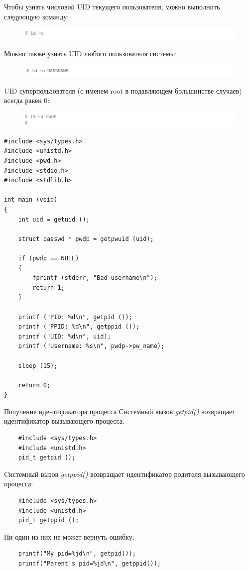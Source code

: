 \documentclass[xcolor=table]{beamer}
\begin{document}
\begin{frame}
	Чтобы узнать числовой UID текущего пользователя, можно выполнить следующую команду:
	\begin{figure}[h]
		\centering
		\includegraphics[scale=0.4]{images/lec07-pic26.png}
	\end{figure}
	Можно также узнать UID любого пользователя системы:
	\begin{figure}[h]
		\centering
		\includegraphics[scale=0.4]{images/lec07-pic27.png}
	\end{figure}
	UID суперпользователя (с именем root в подавляющем большинстве случаев) всегда равен 0:
	\begin{figure}[h]
		\centering
		\includegraphics[scale=0.4]{images/lec07-pic28.png}
	\end{figure}
\end{frame}

\begin{frame}
	\begin{verbatim}
#include <sys/types.h>
#include <unistd.h>
#include <pwd.h>
#include <stdio.h>
#include <stdlib.h>

int main (void)
{
    int uid = getuid ();

    struct passwd * pwdp = getpwuid (uid);
    
    if (pwdp == NULL)
    {
        fprintf (stderr, "Bad username\n");
        return 1;
    }

    printf ("PID: %d\n", getpid ());
    printf ("PPID: %d\n", getppid ());
    printf ("UID: %d\n", uid);
    printf ("Username: %s\n", pwdp->pw_name);

    sleep (15);

    return 0;
}
	\end{verbatim}
\end{frame}

\begin{frame}[fragile]{Получение идентификатора процесса}
	Системный вызов \textit{getpid()} возвращает идентификатор вызывающего процесса:
	\begin{verbatim}
	#include <sys/types.h>
	#include <unistd.h>
	pid_t getpid ();
	\end{verbatim}
	Cистемный вызов \textit{getppid()} возвращает идентификатор родителя вызывающего процесса:
	\begin{verbatim}
	#include <sys/types.h>
	#include <unistd.h>
	pid_t getppid ();
	\end{verbatim}
	Ни один из них не может вернуть ошибку:
	\begin{verbatim}
	printf("My pid=%jd\n", getpid());
	printf("Parent's pid=%jd\n", getppid());
	\end{verbatim}
\end{frame}
\end{document}
